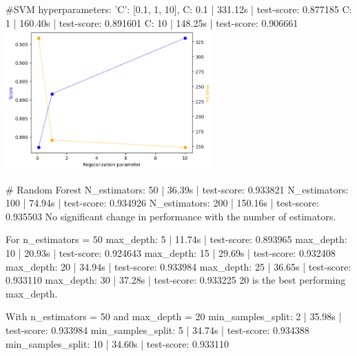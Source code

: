 \documentclass[12pt, letterpaper]{article}
\begin{document}
#SVM
hyperparameters: 'C': [0.1, 1, 10],
C: 0.1 | 331.12s | test-score: 0.877185
C: 1 | 160.40s | test-score: 0.891601
C: 10 | 148.25s | test-score: 0.906661
\includegraphics[width=0.6\textwidth]{svm_c_compiled.png}

# Random Forest
N_estimators: 50 | 36.39s | test-score: 0.933821
N_estimators: 100 | 74.94s | test-score: 0.934926
N_estimators: 200 | 150.16s | test-score: 0.935503
No significant change in performance with the number of estimators.

For n_estimators = 50
max_depth: 5 | 11.74s | test-score: 0.893965
max_depth: 10 | 20.93s | test-score: 0.924643
max_depth: 15 | 29.69s | test-score: 0.932408
max_depth: 20 | 34.94s | test-score: 0.933984
max_depth: 25 | 36.65s | test-score: 0.933110
max_depth: 30 | 37.28s | test-score: 0.933225
20 is the best performing max_depth.

With n_estimators = 50 and max_depth = 20
min_samples_split: 2 | 35.98s | test-score: 0.933984
min_samples_split: 5 | 34.74s | test-score: 0.934388
min_samples_split: 10 | 34.60s | test-score: 0.933110
\end{document}
